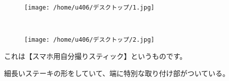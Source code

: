 \documentclass[10pt]{book}
\begin{document}
\begin{figure}[H]
        \centering
        \begin{subfloat}{}
                {\texttt{[image: /home/u406/デスクトップ/1.jpg]}}
        \end{subfloat}~
        \begin{subfloat}{}
                {\texttt{[image: /home/u406/デスクトップ/2.jpg]}}
        \end{subfloat}
\end{figure}\vspace{1in}
これは【スマホ用自分撮りスティック】というものです。\\\newline

細長いステーキの形をしていて、端に特別な取り付け部がついている。\\\newline
\end{document}
